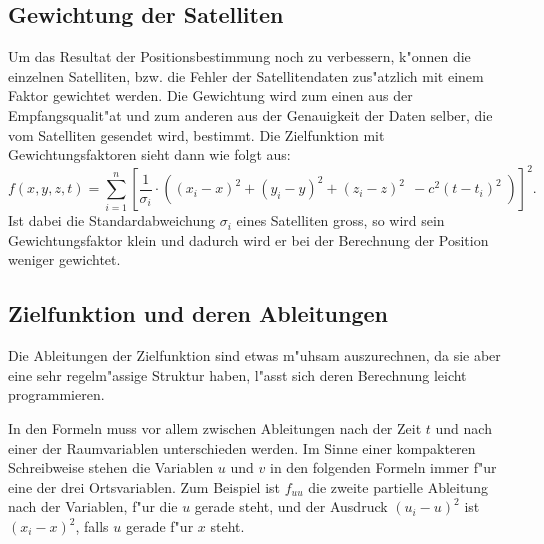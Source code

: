 \begin{refsection}
\subsection{Gewichtung der Satelliten}
Um das Resultat der Positionsbestimmung noch zu verbessern, k"onnen die
einzelnen Satelliten, bzw. die Fehler der Satellitendaten zus"atzlich
mit einem Faktor gewichtet werden. Die Gewichtung wird zum einen aus
der Empfangsqualit"at und zum anderen aus der Genauigkeit der Daten
selber, die vom Satelliten gesendet wird, bestimmt. Die Zielfunktion
mit Gewichtungsfaktoren sieht dann wie folgt aus:
\[
f(x,y,z,t) =
\sum_{i=1}^{n}\left[\frac{1}{\sigma_i}\cdot \left((x_i-x)^2 + (y_i-y)^2 + (z_i-z)^2\;\, - c^2 (t-t_i)^2\;\right)\right]^2.
\]
Ist dabei die Standardabweichung $\sigma_i$ eines Satelliten gross, so
wird sein Gewichtungsfaktor klein und dadurch wird er bei der Berechnung
der Position weniger gewichtet.

\subsection{Zielfunktion und deren Ableitungen}
Die Ableitungen der Zielfunktion sind etwas m"uhsam auszurechnen, da
sie aber eine sehr regelm"assige Struktur haben, l"asst sich
deren Berechnung leicht programmieren.

In den Formeln muss vor allem zwischen Ableitungen nach der Zeit $t$ 
und nach einer der Raumvariablen unterschieden werden.
Im Sinne einer kompakteren Schreibweise stehen die Variablen $u$ und
$v$ in den folgenden Formeln immer f"ur eine der drei Ortsvariablen.
Zum Beispiel ist $f_{uu}$ die zweite partielle Ableitung nach der 
Variablen, f"ur die $u$ gerade steht, und
der Ausdruck $(u_i-u)^2$ ist $(x_i-x)^2$, falls $u$ gerade f"ur $x$ steht.


\end{refsection}
